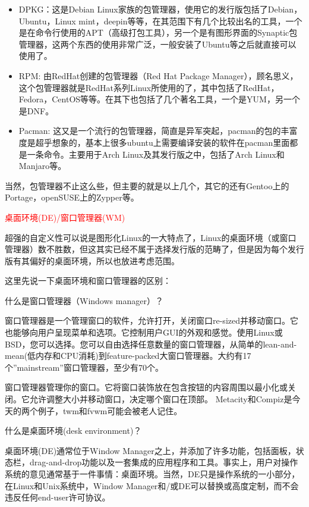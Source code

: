\documentclass[utf8]{book}
\begin{document}
	\begin{itemize}
	\item DPKG：这是Debian Linux家族的包管理器，使用它的发行版包括了Debian，Ubuntu，Linux mint，deepin等等，在其范围下有几个比较出名的工具，一个是在命令行使用的APT（高级打包工具），另一个是有图形界面的Synaptic包管理器，这两个东西的使用非常广泛，一般安装了Ubuntu等之后就直接可以使用了。
	\item RPM: 由RedHat创建的包管理器（Red Hat Package Manager），顾名思义，这个包管理器就是RedHat系列Linux所使用的了，其中包括了RedHat，Fedora，CentOS等等。在其下也包括了几个著名工具，一个是YUM，另一个是DNF。
	\item Pacman: 这又是一个流行的包管理器，简直是异军突起，pacman的包的丰富度是超乎想象的，基本上很多ubuntu上需要编译安装的软件在pacman里面都是一条命令。主要用于Arch Linux及其发行版之中，包括了Arch Linux和Manjaro等。

	\end{itemize}	
	当然，包管理器不止这么些，但主要的就是以上几个，其它的还有Gentoo上的Portage，openSUSE上的Zypper等。


	\begin{center}
	{\LARGE \textcolor{red}{桌面环境(DE)/窗口管理器(WM)}}
	\end{center}

    超强的自定义性可以说是图形化Linux的一大特点了，Linux的桌面环境（或窗口管理器）数不胜数，但这其实已经不属于选择发行版的范畴了，但是因为每个发行版有其偏好的桌面环境，所以也放进考虑范围。
     
    这里先说一下桌面环境和窗口管理器的区别：
 	
 	什么是窗口管理器（Windows manager）？

	窗口管理器是一个管理窗口的软件，允许打开，关闭窗口re-sized并移动窗口。它也能够向用户呈现菜单和选项。它控制用户GUI的外观和感觉。使用Linux或BSD，您可以选择。您可以自由选择任意数量的窗口管理器，从简单的lean-and-mean(低内存和CPU消耗)到feature-packed大窗口管理器。大约有17个”mainstream”窗口管理器，至少有70个。
	
	窗口管理器管理你的窗口。它将窗口装饰放在包含按钮的内容周围以最小化或关闭。它允许调整大小并移动窗口，决定哪个窗口在顶部。 Metacity和Compiz是今天的两个例子，twm和fvwm可能会被老人记住。
	
	什么是桌面环境(desk environment)？
	
	桌面环境(DE)通常位于Window Manager之上，并添加了许多功能，包括面板，状态栏，drag-and-drop功能以及一套集成的应用程序和工具。事实上，用户对操作系统的意见通常基于一件事情：桌面环境。当然，DE只是操作系统的一小部分，在Linux和Unix系统中，Window Manager和/或DE可以替换或高度定制，而不会违反任何end-user许可协议。
	
\end{document}
